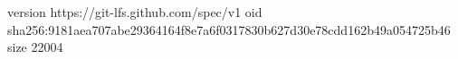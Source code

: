 version https://git-lfs.github.com/spec/v1
oid sha256:9181aea707abe29364164f8e7a6f0317830b627d30e78cdd162b49a054725b46
size 22004
